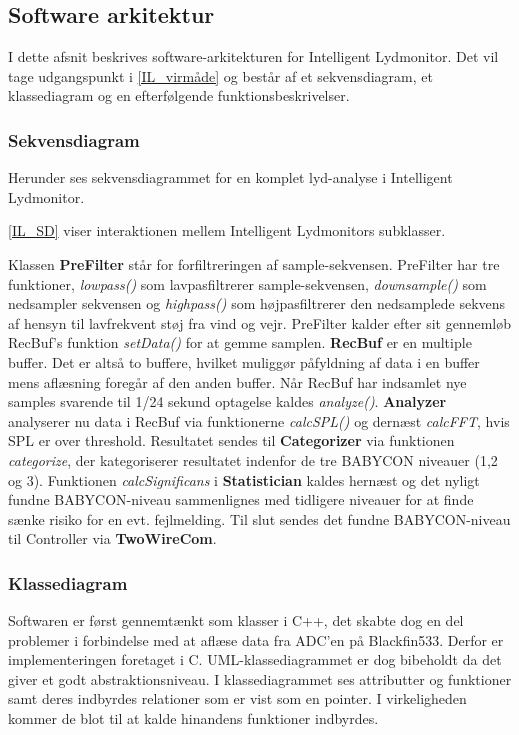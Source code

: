 \newpage
\subsection{Software arkitektur}
I dette afsnit beskrives software-arkitekturen for Intelligent Lydmonitor. Det vil tage udgangspunkt i \ref{IL_virmåde} og består af et sekvensdiagram, et klassediagram og en efterfølgende funktionsbeskrivelser.

\subsubsection*{Sekvensdiagram}
Herunder ses sekvensdiagrammet for en komplet lyd-analyse i Intelligent Lydmonitor.

\ref{IL_SD} viser interaktionen mellem Intelligent Lydmonitors subklasser.

Klassen \textbf{PreFilter} står for forfiltreringen af sample-sekvensen. PreFilter har tre funktioner, \textit{lowpass()} som lavpasfiltrerer sample-sekvensen, \textit{downsample()} som nedsampler sekvensen og \textit{highpass()} som højpasfiltrerer den nedsamplede sekvens af hensyn til lavfrekvent støj fra vind og vejr. PreFilter kalder efter sit gennemløb RecBuf's funktion \textit{setData()} for at gemme samplen.
\textbf{RecBuf} er en multiple buffer. Det er altså to buffere, hvilket muliggør påfyldning af data i en buffer mens aflæsning foregår af den anden buffer. Når RecBuf har indsamlet nye samples svarende til 1/24 sekund optagelse kaldes \textit{analyze()}. \textbf{Analyzer} analyserer nu data i RecBuf via funktionerne \textit{calcSPL()} og dernæst \textit{calcFFT}, hvis SPL er over threshold. Resultatet sendes til \textbf{Categorizer} via funktionen \textit{categorize}, der kategoriserer resultatet indenfor de tre BABYCON niveauer (1,2 og 3). Funktionen \textit{calcSignificans} i \textbf{Statistician} kaldes hernæst og det nyligt fundne BABYCON-niveau sammenlignes med tidligere niveauer for at finde sænke risiko for en evt. fejlmelding. Til slut sendes det fundne BABYCON-niveau til Controller via \textbf{TwoWireCom}. 

\subsubsection*{Klassediagram}
Softwaren er først gennemtænkt som klasser i C++, det skabte dog en del problemer i forbindelse med at aflæse data fra ADC'en på Blackfin533. Derfor er implementeringen foretaget i C. UML-klassediagrammet er dog bibeholdt da det giver et godt abstraktionsniveau. I klassediagrammet ses attributter og funktioner samt deres indbyrdes relationer som er vist som en pointer. I virkeligheden kommer de blot til at kalde hinandens funktioner indbyrdes. 

